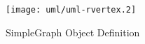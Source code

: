 \begin{figure}[htp]
  \begin{center}
    \texttt{[image: uml/uml-rvertex.2]}

    \caption{SimpleGraph Object Definition}
    \label{fig:netgen-class}
  \end{center}
\end{figure}